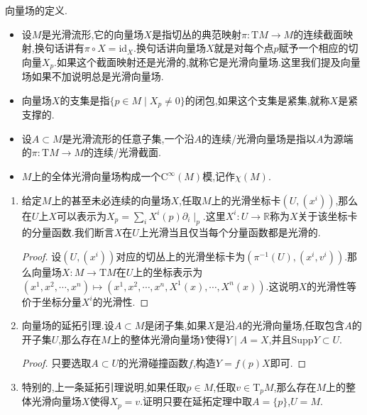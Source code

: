 向量场的定义.
\begin{itemize}
	\item 设$M$是光滑流形,它的向量场$X$是指切丛的典范映射$\pi:\mathrm{T}M\to M$的连续截面映射,换句话讲有$\pi\circ X=\mathrm{id}_X$.换句话讲向量场$X$就是对每个点$p$赋予一个相应的切向量$X_p$.如果这个截面映射还是光滑的,就称它是光滑向量场.这里我们提及向量场如果不加说明总是光滑向量场.
	\item 向量场$X$的支集是指$\{p\in M\mid X_p\not=0\}$的闭包,如果这个支集是紧集,就称$X$是紧支撑的.
	\item 设$A\subset M$是光滑流形的任意子集,一个沿$A$的连续/光滑向量场是指以$A$为源端的$\pi:\mathrm{T}M\to M$的连续/光滑截面.
	\item $M$上的全体光滑向量场构成一个$\mathrm{C}^{\infty}(M)$模,记作$\chi(M)$.
\end{itemize}
\begin{enumerate}
	\item 给定$M$上的甚至未必连续的向量场$X$,任取$M$上的光滑坐标卡$(U,(x^i))$,那么在$U$上$X$可以表示为$X_p=\sum_iX^i(p)\partial_i\mid_p$.这里$X^i:U\to\mathbb{R}$称为$X$关于该坐标卡的分量函数.我们断言$X$在$U$上光滑当且仅当每个分量函数都是光滑的.
	\begin{proof}
		
		设$(U,(x^i))$对应的切丛上的光滑坐标卡为$(\pi^{-1}(U),(x^i,v^i))$.那么向量场$X:M\to\mathrm{T}M$在$U$上的坐标表示为$(x^1,x^2,\cdots,x^n)\mapsto(x^1,x^2,\cdots,x^n,X^1(x),\cdots,X^n(x))$.这说明$X$的光滑性等价于坐标分量$X^i$的光滑性.
	\end{proof}
    \item 向量场的延拓引理.设$A\subset M$是闭子集,如果$X$是沿$A$的光滑向量场,任取包含$A$的开子集$U$,那么存在$M$上的整体光滑向量场$Y$使得$Y\mid A=X$,并且$\mathrm{Supp}Y\subset U$.
    \begin{proof}
    	
    	只要选取$A\subset U$的光滑碰撞函数$f$,构造$Y=f(p)X$即可.
    \end{proof}
    \item 特别的,上一条延拓引理说明,如果任取$p\in M$,任取$v\in\mathrm{T}_pM$,那么存在$M$上的整体光滑向量场$X$使得$X_p=v$.证明只要在延拓定理中取$A=\{p\}$,$U=M$.
\end{enumerate}

